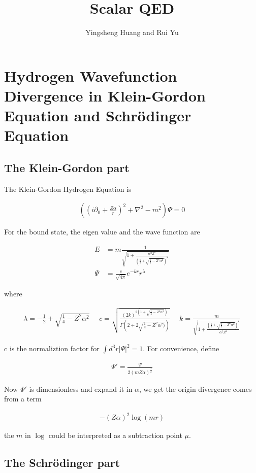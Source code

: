 \documentclass{article}
\title{Scalar QED}
\author{Yingsheng Huang and Rui Yu}
\begin{document}
\maketitle
\section{Hydrogen Wavefunction Divergence in Klein-Gordon Equation and Schr\"odinger Equation}
\subsection{The Klein-Gordon part}
The Klein-Gordon Hydrogen Equation is

\begin{align}
((i\partial_0+\frac{Z\alpha}{r})^2+\nabla^2-m^2)\Psi=0
\end{align}
 
For the bound state, the eigen value and the wave function are

\begin{align}
E&=m\frac{1}{\sqrt{1+\frac{\alpha^2 Z^2}{(\frac{1}{2}+\sqrt{\frac{1}{4}-Z^2\alpha^2})^2}}}\\
\Psi&=\frac{c}{\sqrt{4\pi}}e^{-kr}r^\lambda
\end{align}

where

\begin{align}
\lambda=-\frac{1}{2}+\sqrt{\frac{1}{4}-Z^2\alpha^2}\ \ \ \ \ \ 
c=\sqrt{\frac{(2k)^{2(1+\sqrt{\frac{1}{4}-Z^2\alpha^2})}}{\Gamma(2+2\sqrt{\frac{1}{4}-Z^2\alpha^2)})}}\ \ \ \ \ \ 
k=\frac{m}{\sqrt{1+\frac{(\frac{1}{2}+\sqrt{\frac{1}{4}-Z^2\alpha^2})^2}{\alpha^2Z^2}}}
\end{align}

c is the normaliztion factor for $\int d^3r|\Psi|^2=1$. For convenience, define

\begin{align}
\Psi '=\frac{\Psi}{2(mZ\alpha)^\frac{3}{2}}
\end{align}

Now $\Psi '$ is dimensionless and expand it in $\alpha$, we get the origin divergence comes from a term

\begin{align}
-(Z\alpha)^2\log(m r)
\end{align}

the $m$ in $\log$ could be interpreted as a subtraction point $\mu$.

\subsection{The Schr\"odinger part}
\end{document}
